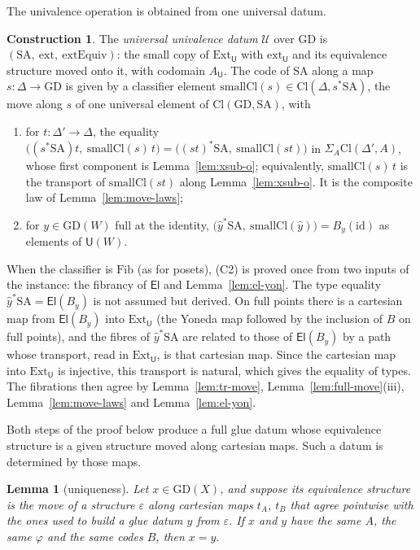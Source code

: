 \documentclass[11pt]{article}
\newcommand{\U}{\mathsf{U}}
\newcommand{\El}{\mathsf{El}}
\newcommand{\Ext}{\mathrm{Ext}}
\newcommand{\ext}{\mathrm{ext}}
\newcommand{\Fib}{\mathrm{Fib}}
\newcommand{\Cl}{\mathrm{Cl}}
\newcommand{\GD}{\mathrm{GD}}
\newcommand{\SA}{\mathrm{SA}}
\theoremstyle{plain}
\newtheorem{lemma}[theorem]{Lemma}
\theoremstyle{definition}
\newtheorem{construction}[theorem]{Construction}
\theoremstyle{remark}
\begin{document}
The univalence operation is obtained from one universal datum.

\begin{construction}
The \emph{universal univalence datum} $\mathcal U$ over $\GD$ is
$(\SA,\ \ext,\ \mathrm{extEquiv})$: the small copy of $\Ext_\U$ with
$\ext_\U$ and its equivalence structure moved onto it, with codomain
$A_\U$. The code of $\SA$ along a map $s:\Delta\to\GD$ is given by a
classifier element $\mathrm{smallCl}(s)\in\Cl(\Delta,s^*\SA)$, the move
along $s$ of one universal element of $\Cl(\GD,\SA)$, with
\begin{enumerate}
\item[(C1)] for $t:\Delta'\to\Delta$, the equality
  $\bigl((s^*\SA)t,\ \mathrm{smallCl}(s)\,t\bigr)
  =\bigl((st)^*\SA,\ \mathrm{smallCl}(st)\bigr)$
  in $\Sigma_{A}\Cl(\Delta',A)$, whose first component is
  Lemma~\ref{lem:xsub-o}; equivalently, $\mathrm{smallCl}(s)\,t$ is the
  transport of $\mathrm{smallCl}(st)$ along Lemma~\ref{lem:xsub-o}. It is
  the composite law of Lemma~\ref{lem:move-laws};
\item[(C2)] for $y\in\GD(W)$ full at the identity,
  $\bigl(\hat y^*\SA,\ \mathrm{smallCl}(\hat y)\bigr)=B_y(\mathrm{id})$
  as elements of $\U(W)$.
\end{enumerate}

When the classifier is $\Fib$ (as for posets), (C2) is proved once from two inputs
of the instance: the fibrancy of $\El$ and Lemma~\ref{lem:el-yon}. The
type equality $\hat y^*\SA=\El(B_y)$ is not assumed but derived. On full
points there is a cartesian map from $\El(B_y)$ into $\Ext_\U$ (the
Yoneda map followed by the inclusion of $B$ on full points), and the
fibres of $\hat y^*\SA$ are related to those of $\El(B_y)$ by a path
whose transport, read in $\Ext_\U$, is that cartesian map. Since the
cartesian map into $\Ext_\U$ is injective, this transport is natural,
which gives the equality of types. The fibrations then agree by
Lemma~\ref{lem:tr-move}, Lemma~\ref{lem:full-move}(iii),
Lemma~\ref{lem:move-laws} and Lemma~\ref{lem:el-yon}.
\end{construction}

Both steps of the proof below produce a full glue datum whose equivalence
structure is a given structure moved along cartesian maps. Such a datum
is determined by those maps.

\begin{lemma}[uniqueness]\label{lem:glue-unique}
Let $x\in\GD(X)$, and suppose its equivalence structure is the move of
a structure $\varepsilon$ along cartesian maps $t_A$, $t_B$ that agree
pointwise with the ones used to build a glue datum $y$ from
$\varepsilon$. If $x$ and $y$ have the same $A$, the same $\varphi$ and
the same codes $B$, then $x=y$.
\end{lemma}
\end{document}
